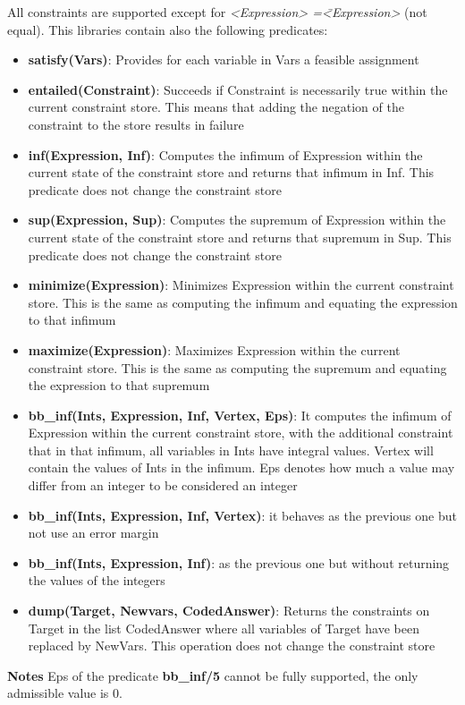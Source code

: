 All constraints are supported except for \textit{<Expression> =\= <Expression>} (not equal).
This libraries contain also the following predicates:
\begin{itemize}
    \item \textbf{satisfy(Vars)}: Provides for each variable in Vars a feasible assignment
    \item \textbf{entailed(Constraint)}: Succeeds if Constraint is necessarily true within the current constraint store. This means that adding the negation of the constraint to the store results in failure
    \item \textbf{inf(Expression, Inf)}: Computes the infimum of Expression within the current state of the constraint store and returns that infimum in Inf. This predicate does not change the constraint store
    \item \textbf{sup(Expression, Sup)}: Computes the supremum of Expression within the current state of the constraint store and returns that supremum in Sup. This predicate does not change the constraint store
    \item \textbf{minimize(Expression)}: Minimizes Expression within the current constraint store. This is the same as computing the infimum and equating the expression to that infimum
    \item \textbf{maximize(Expression)}: Maximizes Expression within the current constraint store. This is the same as computing the supremum and equating the expression to that supremum
    \item \textbf{bb\_inf(Ints, Expression, Inf, Vertex, Eps)}: It computes the infimum of Expression within the current constraint store, with the additional constraint that in that infimum, all variables in Ints have integral values. Vertex will contain the values of Ints in the infimum. Eps denotes how much a value may differ from an integer to be considered an integer
    \item \textbf{bb\_inf(Ints, Expression, Inf, Vertex)}: it behaves as the previous one but not use an error margin
    \item \textbf{bb\_inf(Ints, Expression, Inf)}: as the previous one but without returning the values of the integers
    \item \textbf{dump(Target, Newvars, CodedAnswer)}: Returns the constraints on Target in the list CodedAnswer where all variables of Target have been replaced by NewVars. This operation does not change the constraint store
\end{itemize}
\textbf{Notes}\newline\newline
Eps of the predicate \textbf{bb\_inf/5} cannot be fully supported, the only admissible value is 0.

